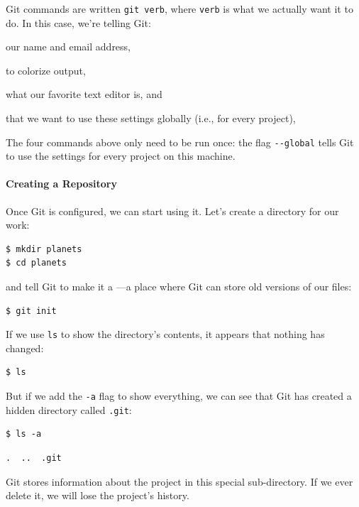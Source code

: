 \documentclass{book}
\begin{document}
Git commands are written \texttt{git verb}, where \texttt{verb} is what
we actually want it to do. In this case, we're telling Git:

\begin{swcitemize}
\item
  our name and email address,
\item
  to colorize output,
\item
  what our favorite text editor is, and
\item
  that we want to use these settings globally (i.e., for every project),
\end{swcitemize}

The four commands above only need to be run once: the flag
\texttt{-{}-global} tells Git to use the settings for every project on
this machine.

\mbox{}\paragraph{Creating a Repository}

Once Git is configured, we can start using it. Let's create a directory
for our work:

\begin{verbatim}
$ mkdir planets
$ cd planets
\end{verbatim}

and tell Git to make it a ---a place
where Git can store old versions of our files:

\begin{verbatim}
$ git init
\end{verbatim}

If we use \texttt{ls} to show the directory's contents, it appears that
nothing has changed:

\begin{verbatim}
$ ls
\end{verbatim}

But if we add the \texttt{-a} flag to show everything, we can see that
Git has created a hidden directory called \texttt{.git}:

\begin{verbatim}
$ ls -a
\end{verbatim}

\begin{verbatim}
.  ..  .git
\end{verbatim}

Git stores information about the project in this special sub-directory.
If we ever delete it, we will lose the project's history.
\end{document}
